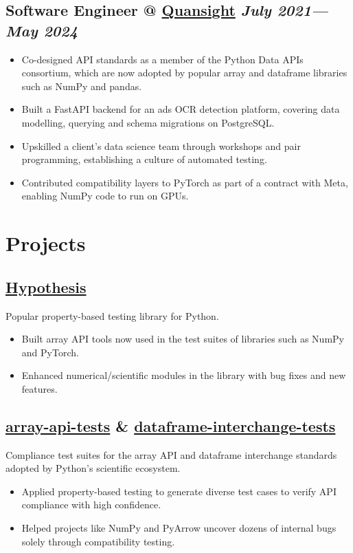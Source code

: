 \documentclass[11pt]{article}
\newcommand{\datedsubsection}[2]{\subsection*{#1 \hfill \textnormal{\scriptsize\textit{#2}}}}
\newcommand{\listhighlights}[1]{
	\begin{itemize}[topsep=2pt, partopsep=0pt, itemsep=2pt, parsep=0pt, leftmargin=12pt]
		#1
	\end{itemize}
}
\begin{document}
\datedsubsection{Software Engineer @ \href{https://www.quansight.com/}{Quansight}}{July 2021—May 2024}

\listhighlights{
	\item Co-designed API standards as a member of the Python Data APIs consortium, which are now adopted by popular array and dataframe libraries such as NumPy and pandas.
	\item Built a FastAPI backend for an ads OCR detection platform, covering data modelling, querying and schema migrations on PostgreSQL.
	\item Upskilled a client’s data science team through workshops and pair programming, establishing a culture of automated testing.
	\item Contributed compatibility layers to PyTorch as part of a contract with Meta, enabling NumPy code to run on GPUs.
}

\section*{Projects}

\subsection*{\href{https://github.com/HypothesisWorks/hypothesis/}{Hypothesis}}

Popular property-based testing library for Python.

\listhighlights{
	\item Built array API tools now used in the test suites of libraries such as NumPy and PyTorch.
	\item Enhanced numerical/scientific modules in the library with bug fixes and new features.
}

\subsection*{\href{https://github.com/data-apis/array-api-tests/}{array-api-tests} \& \href{https://github.com/data-apis/dataframe-interchange-tests/}{dataframe-interchange-tests}}

Compliance test suites for the array API and dataframe interchange standards adopted by Python's scientific ecosystem.

\listhighlights{
	\item Applied property-based testing to generate diverse test cases to verify API compliance with high confidence.
	\item Helped projects like NumPy and PyArrow uncover dozens of internal bugs solely through compatibility testing.
}
\end{document}

